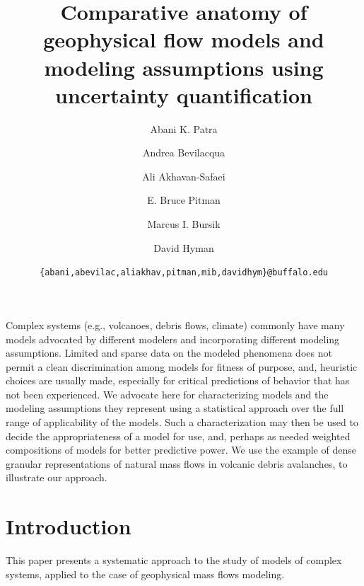 \documentclass{article}
\begin{document}
\title{\bf Comparative anatomy of geophysical flow models and modeling assumptions using uncertainty quantification}
\author[1,3]{Abani K. Patra}
\author[2]{Andrea Bevilacqua}
\author[1]{Ali Akhavan-Safaei}
\author[4]{E. Bruce Pitman}
\author[2]{Marcus I. Bursik}
\author[2]{David Hyman}


\date{\texttt{\{abani,abevilac,aliakhav,pitman,mib,davidhym\}@buffalo.edu}}


\maketitle
\tableofcontents

\abstract
Complex systems (e.g., volcanoes, debris flows, climate) commonly have many models advocated by different modelers and incorporating different modeling assumptions. Limited and sparse data on the modeled phenomena does not permit a clean discrimination among models for fitness of purpose, and, heuristic choices are usually made, especially for critical predictions of behavior that has not been experienced. We advocate here for characterizing models and the modeling assumptions they represent using a statistical approach over the full range of applicability of the models. Such a characterization may then be used to decide the appropriateness of a model for use, and, perhaps as needed weighted compositions of models for better predictive power. We use the example of dense granular representations of natural mass flows in volcanic debris avalanches, to illustrate our approach.

\newpage
\section{Introduction}
This paper presents a systematic approach to the study of models of complex systems, applied to the case of geophysical mass flows modeling.
\end{document}

